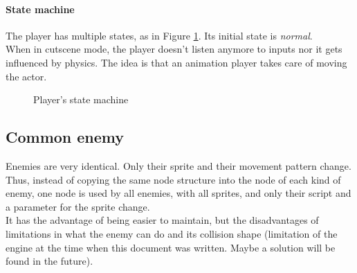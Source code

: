 \documentclass[10pt,a4paper]{article}
\begin{document}
\paragraph{State machine}
The player has multiple states, as in Figure \ref{fig:player_state_machine}. Its initial state is \textit{normal}.\\
When in cutscene mode, the player doesn't listen anymore to inputs nor it gets influenced by physics. The idea is that an animation player takes care of moving the actor.
\begin{figure}[h]
\centering
{}
\caption{Player's state machine}
\label{fig:player_state_machine}
\end{figure}

\subsection{Common enemy}
Enemies are very identical. Only their sprite and their movement pattern change. Thus, instead of copying the same node structure into the node of each kind of enemy, one node is used by all enemies, with all sprites, and only their script and a parameter for the sprite change.\\
It has the advantage of being easier to maintain, but the disadvantages of limitations in what the enemy can do and its collision shape (limitation of the engine at the time when this document was written. Maybe a solution will be found in the future).
\end{document}
